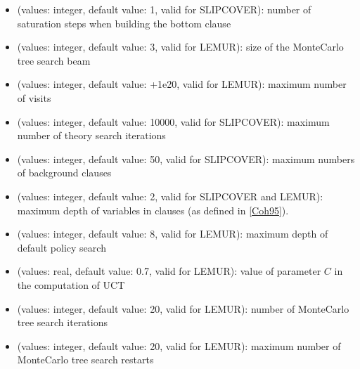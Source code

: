 \documentclass[letterpaper,10pt,english]{sphinxmanual}
\begin{document}
\begin{itemize}
\item {} 
\sphinxAtStartPar
{} (values: integer, default value: 1, valid for SLIPCOVER): number of saturation steps when building the bottom clause

\item {} 
\sphinxAtStartPar
{} (values: integer, default value: 3, valid for LEMUR): size of the Monte\sphinxhyphen{}Carlo tree search beam

\item {} 
\sphinxAtStartPar
{} (values: integer, default value: +1e20, valid for LEMUR): maximum number of visits

\item {} 
\sphinxAtStartPar
{} (values: integer, default value: 10000, valid for SLIPCOVER): maximum number of theory search iterations

\item {} 
\sphinxAtStartPar
{} (values: integer, default value: 50, valid for SLIPCOVER): maximum numbers of background clauses

\item {} 
\sphinxAtStartPar
{} (values: integer, default value: 2, valid for SLIPCOVER and LEMUR): maximum depth of variables in clauses (as defined in {[}\hyperlink{cite.index:id64}{Coh95}{]}).

\item {} 
\sphinxAtStartPar
{} (values: integer, default value: 8, valid for LEMUR): maximum depth of default policy search

\item {} 
\sphinxAtStartPar
{} (values: real, default value: 0.7, valid for LEMUR): value of parameter \(C\) in the computation of UCT

\item {} 
\sphinxAtStartPar
{} (values: integer, default value: 20, valid for LEMUR): number of Monte\sphinxhyphen{}Carlo tree search iterations

\item {} 
\sphinxAtStartPar
{} (values: integer, default value: 20, valid for LEMUR): maximum number of Monte\sphinxhyphen{}Carlo tree search restarts


\end{itemize}
\end{document}
